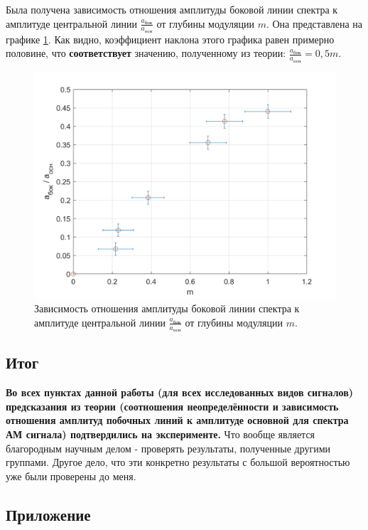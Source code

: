 \documentclass[a4paper,12pt]{article}
\begin{document}
Была получена зависимость отношения амплитуды боковой линии спектра к амплитуде центральной линии $\frac{a_\text{бок}}{a_\text{осн}}$ от глубины модуляции $m$. Она представлена на графике \ref{PlotC}. Как видно, коэффициент наклона этого графика равен примерно половине, что \textbf{соответствует} значению, полученному из теории: $\frac{a_\text{бок}}{a_\text{осн}} = 0,5m$.

\begin{figure}[tpb]
\centering
\includegraphics[width=160mm]{PlotC.png}
\caption{Зависимость отношения амплитуды боковой линии спектра к амплитуде центральной линии $\frac{a_\text{бок}}{a_\text{осн}}$ от глубины модуляции $m$.}
\label{PlotC}
\end{figure}

\bigskip


\bigskip

\subsection*{Итог}
\bigskip
\textbf{Во всех пунктах данной работы (для всех исследованных видов сигналов) предсказания из теории (соотношения неопределённости и зависимость отношения амплитуд побочных линий к амплитуде основной для спектра АМ сигнала) подтвердились на эксперименте.} Что вообще является благородным научным делом - проверять результаты, полученные другими группами. Другое дело, что эти конкретно результаты с большой вероятностью уже были проверены до меня. 
 
\subsection*{Приложение}
\bigskip
\end{document}
